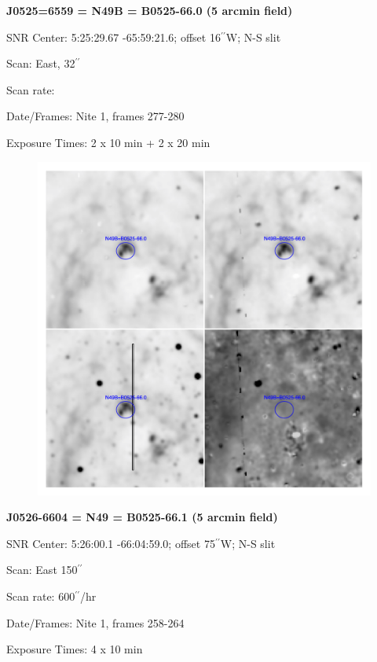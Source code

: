 \documentclass[11pt]{article}
\newcommand{\arcsec}{$^{\prime\prime}$}
\begin{document}
\newpage
{\bf J0525=6559 = N49B = B0525-66.0 (5 arcmin field)}  
 
SNR Center:   5:25:29.67  -65:59:21.6;     offset 16\arcsec W;  N-S slit

Scan:  East, 32\arcsec

Scan rate:  

Date/Frames:  Nite 1, frames 277-280

Exposure Times:  2 x 10 min  +  2 x 20 min

\begin{figure}
\includegraphics[width=11.cm]{snapshots/N49B_5arcmin.png}
\end{figure}

\newpage
{\bf J0526-6604 = N49 = B0525-66.1 (5 arcmin field)}  
 
SNR Center:   5:26:00.1   -66:04:59.0;  offset 75\arcsec W;      N-S slit

Scan:  East   150\arcsec

Scan rate:    600\arcsec/hr

Date/Frames:  Nite 1, frames 258-264

Exposure Times:  4 x 10 min
\end{document}
